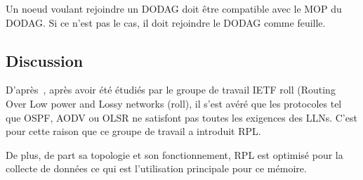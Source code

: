     Un noeud voulant rejoindre un DODAG doit être compatible avec le MOP du DODAG. Si ce n'est pas le cas, il doit rejoindre le DODAG comme feuille.



\subsection*{Discussion}

    D'après~\cite{paper:rpl-study}, après avoir été étudiés par le groupe de travail IETF roll (Routing Over Low power and Lossy networks (roll), il s'est avéré que les protocoles tel que OSPF, AODV ou OLSR ne satisfont pas toutes les exigences des LLNs. C'est pour cette raison que ce groupe de travail a introduit RPL.

    De plus, de part sa topologie et son fonctionnement, RPL est optimisé pour la collecte de données ce qui est l'utilisation principale pour ce mémoire.



